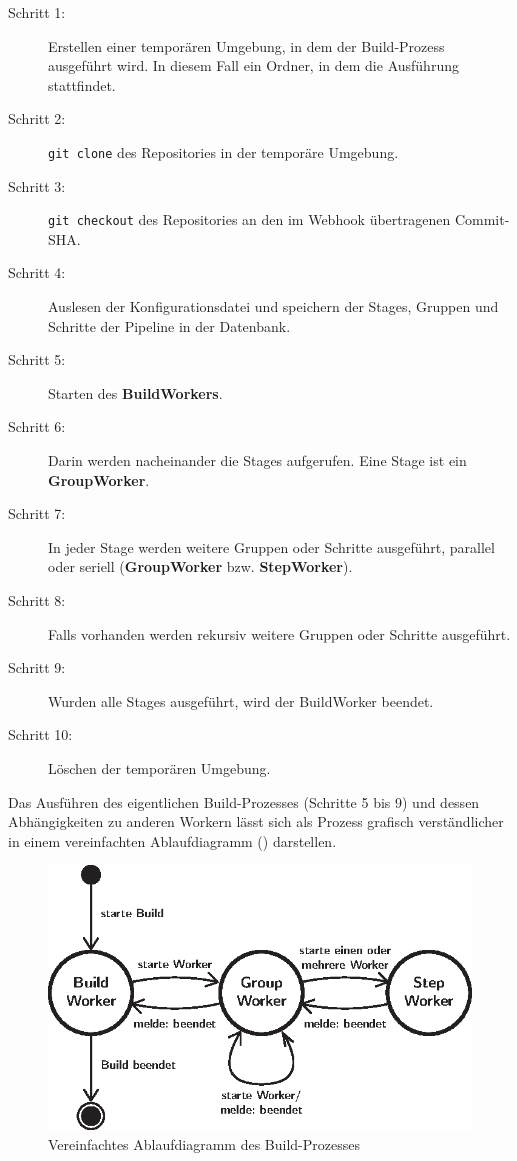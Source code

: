 \begin{description}
  \item[Schritt 1:] Erstellen einer temporären Umgebung, in dem der Build-Prozess ausgeführt wird. In diesem Fall ein Ordner, in dem die Ausführung stattfindet.
  \item[Schritt 2:] \texttt{git clone} des Repositories in der temporäre Umgebung.
  \item[Schritt 3:] \texttt{git checkout} des Repositories an den im Webhook übertragenen Commit-SHA.
  \item[Schritt 4:] Auslesen der Konfigurationsdatei und speichern der Stages, Gruppen und Schritte der Pipeline in der Datenbank.
  \item[Schritt 5:] Starten des \textbf{BuildWorkers}.
  \item[Schritt 6:] Darin werden nacheinander die Stages aufgerufen. Eine Stage ist ein \textbf{GroupWorker}.
  \item[Schritt 7:] In jeder Stage werden weitere Gruppen oder Schritte ausgeführt, parallel oder seriell (\textbf{GroupWorker} bzw. \textbf{StepWorker}).
  \item[Schritt 8:] Falls vorhanden werden rekursiv weitere Gruppen oder Schritte ausgeführt.
  \item[Schritt 9:] Wurden alle Stages ausgeführt, wird der BuildWorker beendet.
  \item[Schritt 10:] Löschen der temporären Umgebung.
\end{description}

Das Ausführen des eigentlichen Build-Prozesses (Schritte 5 bis 9) und dessen Abhängigkeiten zu anderen Workern lässt sich als Prozess grafisch verständlicher in einem vereinfachten Ablaufdiagramm () darstellen.

\begin{figure}[h]
  \caption{Vereinfachtes Ablaufdiagramm des Build-Prozesses}
  \label{fig:ablauf-build-prozess}
  \centering
    \includegraphics[width=.7\textwidth]{assets/worker_diagram}
\end{figure}

